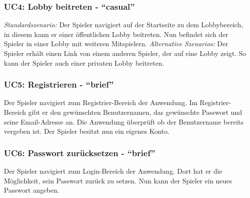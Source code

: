 \documentclass[11pt,ngerman]{article}
\newcommand{\quotes}[1]{``#1''}
\begin{document}
    \subsubsection{UC4: Lobby beitreten - \quotes{casual}}
    \label{sssec:UC4Lobbybeitreten}
    \begin{tcolorbox}[enhanced, breakable, sharp corners, width=\dimexpr\textwidth-15mm\relax ,enlarge left by=10mm ,fontupper=\linespread{1.1}\selectfont, boxrule=1pt, title={UC4: Lobby beitreten }, colback=white, colframe=gray!22, coltitle=black]
    	\textit{Standardszenario:} Der Spieler navigiert auf der Startseite zu dem Lobbybereich, in diesem kann er einer öffentlichen Lobby beitreten. \newline
    	Nun befindet sich der Spieler in einer Lobby mit weiteren Mitspielern.\newline
    	\newline
    	\textit{Alternative Szenarios:} \newline
    	Der Spieler erhält einen Link von einem anderen Spieler, der auf eine Lobby zeigt. So kann der Spieler auch einer privaten Lobby beitreten. \newline
    \end{tcolorbox}

    \subsubsection{UC5: Registrieren - \quotes{brief}}
    \label{sssec:UC5Registrieren}
    \begin{tcolorbox}[enhanced, breakable, sharp corners, width=\dimexpr\textwidth-15mm\relax ,enlarge left by=10mm ,fontupper=\linespread{1.1}\selectfont, boxrule=1pt, title={UC5: Registrieren}, colback=white, colframe=gray!22, coltitle=black]
    	Der Spieler navigiert zum Registrier-Bereich der Anwendung. Im Registrier-Bereich gibt er den gewünschten Benutzernamen, das gewünschte Passwort und seine Email-Adresse an.\newline
    	Die Anwendung überprüft ob der Benutzername bereits vergeben ist. Der Spieler besitzt nun ein eigenes Konto.
    \end{tcolorbox}

    \subsubsection{UC6: Passwort zurücksetzen - \quotes{brief}}
    \label{sssec:UC6Passwortsetzen}
    \begin{tcolorbox}[enhanced, breakable, sharp corners, width=\dimexpr\textwidth-15mm\relax ,enlarge left by=10mm ,fontupper=\linespread{1.1}\selectfont, boxrule=1pt, title={UC6: Passwort zurücksetzen}, colback=white, colframe=gray!22, coltitle=black]
    	Der Spieler navigiert zum Login-Bereich der Anwendung. Dort hat er die Möglichkeit, sein Passwort zurück zu setzen.\newline
    	Nun kann der Spieler ein neues Passwort angeben.
    \end{tcolorbox}
\end{document}
